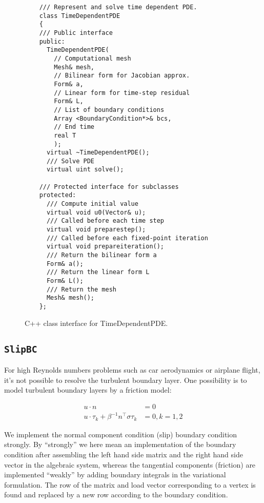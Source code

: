 \begin{figure}[!h]
{\small
\begin{lstlisting}
    /// Represent and solve time dependent PDE.
    class TimeDependentPDE
    {
    /// Public interface
    public:
      TimeDependentPDE(
        // Computational mesh
        Mesh& mesh,
        // Bilinear form for Jacobian approx.
        Form& a,
        // Linear form for time-step residual
        Form& L,
        // List of boundary conditions
        Array <BoundaryCondition*>& bcs,
        // End time
        real T
        );
      virtual ~TimeDependentPDE();
      /// Solve PDE
      virtual uint solve();

    /// Protected interface for subclasses
    protected:
      /// Compute initial value
      virtual void u0(Vector& u);
      /// Called before each time step
      virtual void preparestep();
      /// Called before each fixed-point iteration
      virtual void prepareiteration();
      /// Return the bilinear form a
      Form& a();
      /// Return the linear form L
      Form& L();
      /// Return the mesh
      Mesh& mesh();
    };
\end{lstlisting}
}
\caption{
C++ class interface for TimeDependentPDE.
}
\label{code:TimeDependentPDE}
\end{figure}


\subsection{\tt SlipBC}

For high Reynolds numbers problems such as car aerodynamics or
airplane flight, it's not possible to resolve the turbulent boundary
layer. One possibility is to model turbulent boundary layers by a
friction model:

\begin{align}
u \cdot n &= 0\\
u \cdot \tau_k + \beta^{-1} n^\top \sigma \tau_k &= 0, k = 1, 2
\end{align}

We implement the normal component condition (slip) boundary condition
strongly. By ``strongly'' we here mean an implementation of the
boundary condition after assembling the left hand side matrix and the
right hand side vector in the algebraic system, whereas the tangential
components (friction) are implemented ``weakly'' by adding boundary
integrals in the variational formulation.  The row of the matrix and
load vector corresponding to a vertex is found and replaced by a new
row according to the boundary condition.
 
